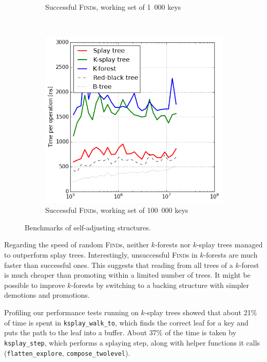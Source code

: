 \begin{figure}
\begin{subfigure}[t]{0.31\textwidth}
	\caption{Successful \textsc{Find}s, working set of 1~000 keys}
	\label{fig:sub:self-adj-ws-1k}
\end{subfigure}
~
\begin{subfigure}[t]{0.31\textwidth}
	\includegraphics[width=\textwidth]{img/performance/self-adj-ws-100k}
	\caption{Successful \textsc{Find}s, working set of 100~000 keys}
	\label{fig:sub:self-adj-ws-100k}
\end{subfigure}
\caption{Benchmarks of self-adjusting structures.}
\label{fig:self-adj-performance}
\end{figure}

Regarding the speed of random \textsc{Find}s, neither $k$-forests nor $k$-splay
trees managed to outperform splay trees. Interestingly, unsuccessful
\textsc{Find}s in $k$-forests are much faster than successful ones. This
suggests that reading from all trees of a $k$-forest is much cheaper than
promoting within a limited number of trees. It might be possible to improve
$k$-forests by switching to a backing structure with simpler demotions and
promotions.

Profiling our performance tests running on $k$-splay trees showed that about
21\% of time is spent in \texttt{ksplay\_walk\_to}, which finds the correct
leaf for a key and puts the path to the leaf into a buffer. About 37\% of the
time is taken by \texttt{ksplay\_step}, which performs a splaying step, along
with helper functions it calls (\texttt{flatten\_explore},
\texttt{compose\_twolevel}).

